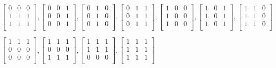 \begin{center}
$
\begin{bmatrix}
0 & 0 & 0 \\
1 & 1 & 1 \\
1 & 1 & 1 \\
\end{bmatrix}
,
\begin{bmatrix}
0 & 0 & 1 \\
0 & 0 & 1 \\
0 & 0 & 1 \\
\end{bmatrix}
,
\begin{bmatrix}
0 & 1 & 0 \\
0 & 1 & 0 \\
0 & 1 & 0 \\
\end{bmatrix}
,
\begin{bmatrix}
0 & 1 & 1 \\
0 & 1 & 1 \\
0 & 1 & 1 \\
\end{bmatrix}
,
\begin{bmatrix}
1 & 0 & 0 \\
1 & 0 & 0 \\
1 & 0 & 0 \\
\end{bmatrix}
,
\begin{bmatrix}
1 & 0 & 1 \\
1 & 0 & 1 \\
1 & 0 & 1 \\
\end{bmatrix}
,
\begin{bmatrix}
1 & 1 & 0 \\
1 & 1 & 0 \\
1 & 1 & 0 \\
\end{bmatrix}
$
\end{center}
\begin{center}
$
\begin{bmatrix}
1 & 1 & 1 \\
0 & 0 & 0 \\
0 & 0 & 0 \\
\end{bmatrix}
,
\begin{bmatrix}
1 & 1 & 1 \\
0 & 0 & 0 \\
1 & 1 & 1 \\
\end{bmatrix}
,
\begin{bmatrix}
1 & 1 & 1 \\
1 & 1 & 1 \\
0 & 0 & 0 \\
\end{bmatrix}
,
\begin{bmatrix}
1 & 1 & 1 \\
1 & 1 & 1 \\
1 & 1 & 1 \\
\end{bmatrix}
$
\end{center}